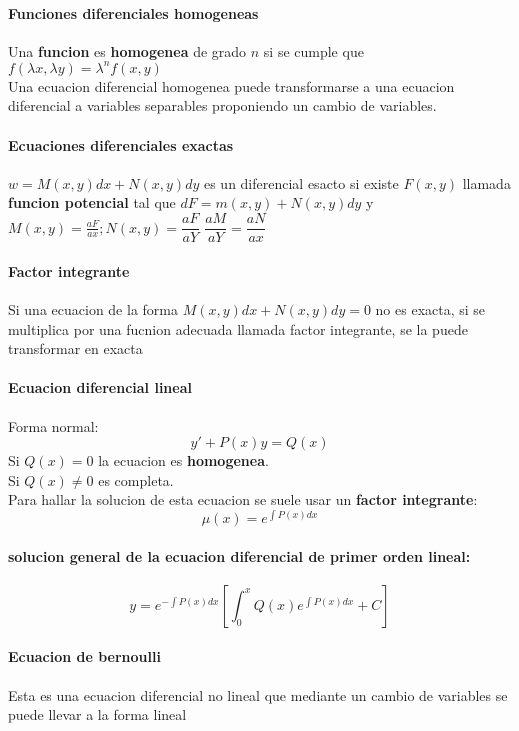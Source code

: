 \documentclass[11pt]{article}
\begin{document}
\paragraph{Funciones diferenciales homogeneas}
Una \textbf{funcion} es \textbf{homogenea} de grado $n$ si se cumple que $f(\lambda x, \lambda y) = \lambda^n f(x,y)$\\
Una ecuacion diferencial homogenea puede transformarse a una ecuacion diferencial a variables separables proponiendo un cambio de variables.
\paragraph{Ecuaciones diferenciales exactas}
$w = M(x,y)dx + N(x,y)dy$ es un diferencial esacto si existe $F(x,y)$ llamada \textbf{funcion potencial} tal que $dF = m(x,y) + N(x,y)dy$ y $M(x,y) = \frac{aF}{ax} ; N(x,y) = \dfrac{aF}{aY}$ $\dfrac{aM}{aY} = \dfrac{aN}{ax}$
\paragraph{Factor integrante}
Si una ecuacion de la forma $M(x,y)dx + N(x,y)dy = 0$ no es exacta, si se multiplica por una fucnion adecuada llamada factor integrante, se la puede transformar en exacta
\paragraph{Ecuacion diferencial lineal}
Forma normal:
\begin{equation*}
	y' + P(x)y = Q(x)
\end{equation*}
Si $Q(x)=0$ la ecuacion es \textbf{homogenea}.\\
Si $Q(x) \neq 0$ es completa.\\
\linebreak
Para hallar la solucion de esta ecuacion se suele usar un \textbf{factor integrante}:
\begin{equation*}
	\mu (x) = e^{\int P(x)dx}
\end{equation*} 
\paragraph{solucion general de la ecuacion diferencial de primer orden lineal:}
\begin{equation*}
	y = e^{- \int P(x)dx} \left[ \int_{0}^{x} Q(x) e^{\int P(x)dx}+C \right]
\end{equation*}
\paragraph{Ecuacion de bernoulli}
Esta es una ecuacion diferencial no lineal que mediante un cambio de variables se puede llevar a la forma lineal
\end{document}
